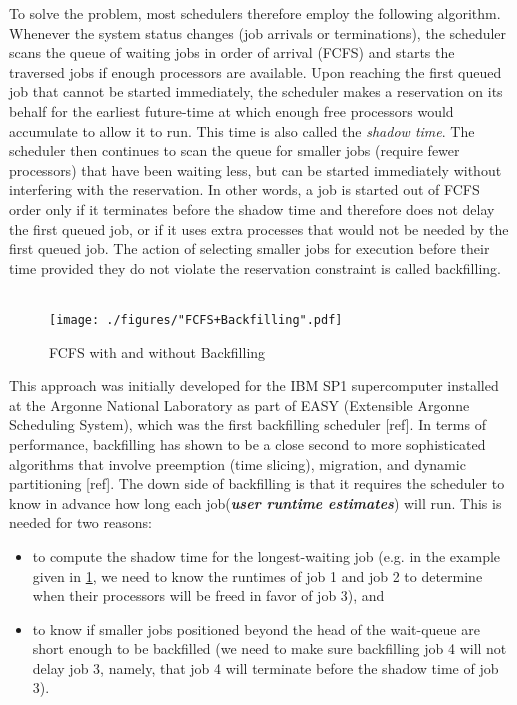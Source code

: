 To solve the problem, most schedulers therefore employ the following algorithm. Whenever the system status changes (job arrivals or terminations), the scheduler scans the queue of waiting jobs in order of arrival (FCFS) and starts the traversed jobs if enough processors are available. Upon reaching the first queued job that cannot be started immediately, the scheduler makes a reservation on its behalf for the earliest future-time at which enough free processors would accumulate to allow it to run. This time is also called the \textit{shadow time}. The scheduler then continues to scan the queue for smaller jobs (require fewer processors) that have been waiting less, but can be started immediately without interfering with the reservation. In other words, a job is started out of FCFS order only if it terminates before the shadow time and therefore does not delay the first queued job, or if it uses extra processes that would not be needed by the first queued job. The action of selecting smaller jobs for execution before their time provided they do not violate the reservation constraint is called backfilling.\\ \\
\begin{figure}[!htbp]
\centering
\texttt{[image: ./figures/"FCFS+Backfilling".pdf]}
\caption{FCFS with and without Backfilling}
\label{fig:32}
\end{figure}
This approach was initially developed for the IBM SP1 supercomputer installed at the Argonne National Laboratory as part of EASY (Extensible Argonne Scheduling System), which was the first backfilling scheduler [ref]. In terms of performance, backfilling has shown to be a close second to more sophisticated algorithms that involve preemption (time slicing), migration, and dynamic partitioning [ref]. The down side of backfilling is that it requires the scheduler to know in advance how long each job(\textbf{\textit{user runtime estimates}}) will run. This is needed for two reasons:
\begin{itemize}
\item to compute the shadow time for the longest-waiting job (e.g. in the example given in \ref{fig:32}, we need to know the runtimes of job 1 and job 2 to determine when their processors will be freed in favor of job 3), and
\item to know if smaller jobs positioned beyond the head of the wait-queue are short enough to be backfilled (we need to make sure backfilling job 4 will not delay job 3, namely, that job 4 will terminate before the shadow time of job 3).
\end{itemize}
